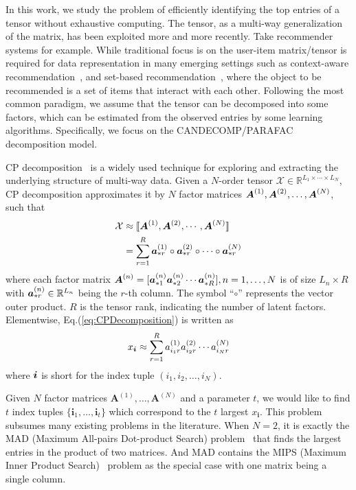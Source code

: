 \documentclass[letterpaper]{article}
\newcommand{\Sca}[3]{{#1}^{(#2)}_{i_#2#3}}%
\newcommand{\anr}[2]{\Sca{a}{#1}{#2}}
\newcommand{\T}[1]{\mathcal{#1}}
\newcommand{\KT}[1]{\llbracket #1 \rrbracket}
\newcommand{\V}[1]{{\boldsymbol{{\MakeLowercase{#1}}}}}
\newcommand{\ColVec}[3]{\V{#1}^{(#2)}_{#3}}
\newcommand{\ColVecA}[1]{\V{a}^{(#1)}_{*r}}
\newcommand{\M}[1]{{\boldsymbol{{\MakeUppercase{#1}}}}}
\newcommand{\FacMat}[2]{\M{#1}^{(#2)}}
\newcommand{\Eqn}[1]{Eq.(\ref{eq:#1})}
\begin{document}
In this work, 
we study the problem of efficiently identifying the top entries of a tensor 
without exhaustive computing. 
The tensor, as a multi-way generalization of the matrix, 
has been exploited more and more recently. 
Take recommender systems for example. 
While traditional focus is on the user-item matrix/tensor 
is required for data representation in many emerging settings 
such as context-aware recommendation~\cite{Rendle_PITF,KoYe09}, 
and set-based recommendation~\cite{HuYiLa15},
where the object to be recommended is a set of items that interact with each other. 
Following the most common paradigm, we assume that the tensor can be decomposed into some factors, 
which can be estimated from the observed entries by some learning algorithms. 
Specifically, we focus on the CANDECOMP/PARAFAC decomposition model.

CP decomposition~\cite{KoBa09} is a widely used technique for exploring and 
extracting the underlying structure of multi-way data. 
Given a $N$-order tensor $\T{X}\in\mathbb{R}^{L_1\times \cdots\times L_N}$, 
CP decomposition approximates it by $N$ factor matrices $\FacMat{A}{1},\FacMat{A}{2},\ldots,\FacMat{A}{N}$, 
such that
\begin{align}
\label{eq:CPDecomposition}
\T{X}&\approx\KT{\FacMat{A}{1},\FacMat{A}{2},\cdots,\FacMat{A}{N}} \\ \notag
&=\sum_{r=1}^R\ColVecA{1}\circ\ColVecA{2}\circ\cdots\circ\ColVecA{N}
\end{align}
where each factor matrix 
$\FacMat{A}{n}=[\ColVec{a}{n}{*1}\ColVec{a}{n}{*2}\cdots\ColVec{a}{n}{*R}], n=1,\ldots,N$
is of size $L_n\times R$ with $\ColVec{a}{n}{*r}\in\mathbb{R}^{L_n}$ 
being the $r$-th column.
The symbol ``$\circ$'' represents the vector outer product. 
$R$ is the tensor rank, indicating the number of latent factors. 
Elementwise, \Eqn{CPDecomposition} is written as
\begin{align}
\label{eq:CPValue}
x_\V{i} \approx \sum_{r=1}^{R}\anr{1}{r}\anr{2}{r}\cdots\anr{N}{r}
\end{align}
where $\V{i}$ is short for the index tuple $(i_1,i_2,\ldots,i_N)$.

Given $N$ factor matrices $\textbf{A}^{(1)},\ldots,\textbf{A}^{(N)}$ and a parameter $t$, 
we would like to find $t$ index tuples $\{\boldsymbol{i}_1,\ldots,\boldsymbol{i}_t\}$ 
which correspond to the $t$ largest $x_{\boldsymbol{i}}$.
This problem subsumes many existing problems in the literature.
When $N=2$, it is exactly the MAD (Maximum All-pairs Dot-product Search) problem~\cite{BaPiKoSe15}
that finds the largest entries in the product of two matrices. 
And MAD contains the MIPS (Maximum Inner Product Search)~\cite{Cohen97} problem 
as the special case with one matrix being a single column.
\end{document}
